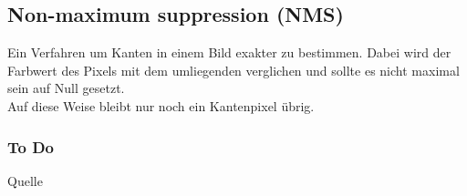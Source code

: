 \subsection{Non-maximum suppression  (NMS)}
Ein Verfahren um Kanten in einem Bild exakter zu bestimmen. Dabei wird der Farbwert des Pixels mit dem umliegenden verglichen und sollte es nicht maximal sein auf Null gesetzt.\\
Auf diese Weise bleibt nur noch ein Kantenpixel übrig.
\subsubsection{To Do}
Quelle